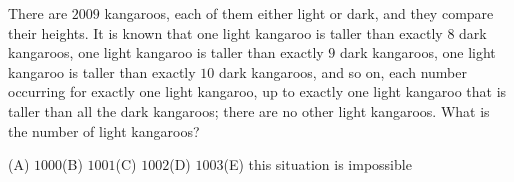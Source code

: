 There are $2009$ kangaroos, each of them either light or dark, and they compare their heights. It is known that one light kangaroo is taller than exactly $8$ dark kangaroos, one light kangaroo is taller than exactly $9$ dark kangaroos, one light kangaroo is taller than exactly $10$ dark kangaroos, and so on, each number occurring for exactly one light kangaroo, up to exactly one light kangaroo that is taller than all the dark kangaroos; there are no other light kangaroos. What is the number of light kangaroos?

(A) $1000$\quad (B) $1001$\quad (C) $1002$\quad (D) $1003$\quad (E) this situation is impossible
